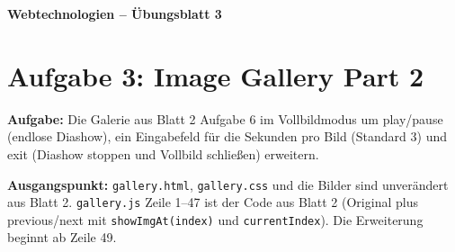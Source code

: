 \documentclass[11pt,a4paper]{article}
\begin{document}
\begin{center}
  {\Large\textbf{Webtechnologien -- Übungsblatt 3}}
\end{center}
\section*{Aufgabe 3: Image Gallery Part 2}
\textbf{Aufgabe:} Die Galerie aus Blatt 2 Aufgabe 6 im Vollbildmodus um
\glqq play/pause\grqq{} (endlose Diashow), ein Eingabefeld für die
Sekunden pro Bild (Standard 3) und \glqq exit\grqq{} (Diashow stoppen und
Vollbild schließen) erweitern.

\medskip
\textbf{Ausgangspunkt:} \texttt{gallery.html}, \texttt{gallery.css} und
die Bilder sind unverändert aus Blatt 2. \texttt{gallery.js} Zeile 1--47
ist der Code aus Blatt 2 (Original plus previous/next mit
\texttt{showImgAt(index)} und \texttt{currentIndex}). Die Erweiterung
beginnt ab Zeile 49.
\end{document}
